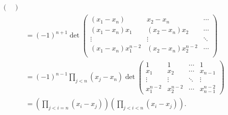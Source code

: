 \begin{solution}
\begin{itemize}
\begin{align*}
\begin{pmatrix}
        \end{pmatrix}\\
        & =
        (-1)^{n+1}
        \det
        \begin{pmatrix}
          (x_1-x_n) & x_2-x_n & \cdots\\%
          (x_1-x_n)x_1 & (x_2-x_n)x_2 & \cdots\\%
          \vdots & \vdots & \ddots\\%
          (x_1-x_n)x_1^{n-2} & (x_2-x_n)x_2^{n-2} & \cdots\\%
        \end{pmatrix}\\
        & =
        (-1)^{n-1} \prod_{j < n} (x_j - x_n)
        \det
        \begin{pmatrix}
          1 & 1 & \cdots & 1\\
          x_1 & x_2 & \cdots & x_{n-1}\\
          \vdots & \vdots & \ddots & \vdots\\
          x_1^{n-2} & x_2^{n-2} & \cdots & x_{n-1}^{n-2}
        \end{pmatrix}\\
        & =
        \left(\prod_{j < i = n} (x_i - x_j)\right)
        \left(\prod_{j < i < n} (x_i - x_j)\right).
      \end{align*}
  \end{itemize}
\end{solution}

